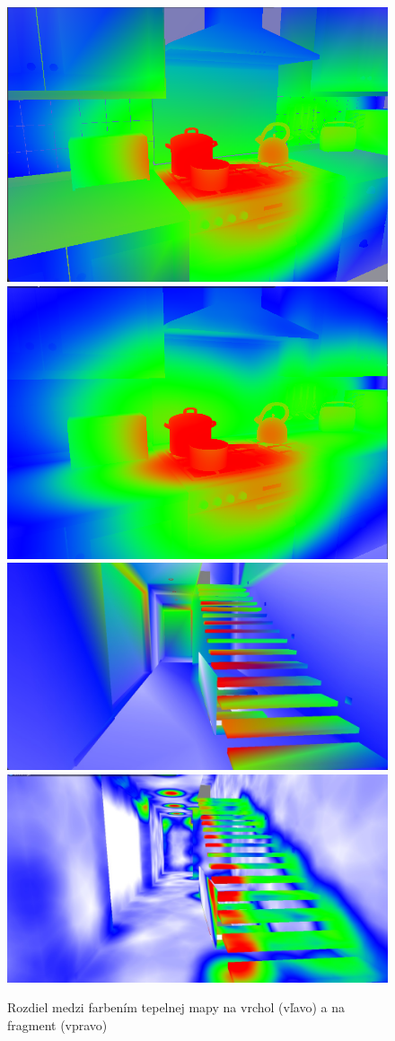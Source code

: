 \begin{figure}[b!]\label{PorovnanieMap}
    \centering
    \includegraphics[width=0.48\linewidth]{obrazky-figures/VertexHM.png}
    \includegraphics[width=0.485\linewidth]{obrazky-figures/FragmentHM.png}
    \includegraphics[width=0.48\linewidth]{obrazky-figures/VertexHM2.jpg}
    \includegraphics[width=0.48\linewidth]{obrazky-figures/FragmentHM2.jpg}
    \caption{Rozdiel medzi farbením tepelnej mapy na vrchol (vľavo) a na fragment (vpravo)}
\end{figure}

